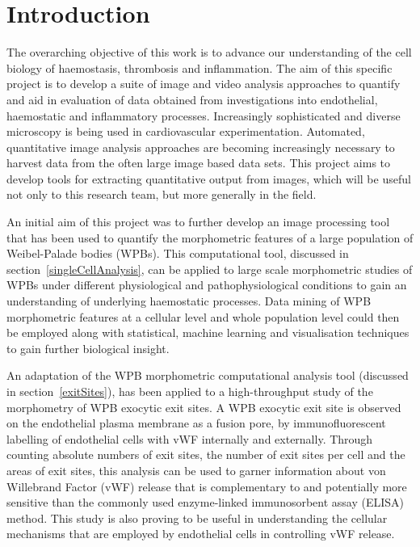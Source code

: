 \chapter{Introduction}
\ifpdf
	\graphicspath{{chapter_1/figs/}}
\fi


The overarching objective of this work is to advance our understanding of the cell biology of haemostasis, thrombosis and inflammation. The aim of this specific project is to develop a suite of image and video analysis approaches to quantify and aid in evaluation of data obtained from investigations into endothelial, haemostatic and inflammatory processes. Increasingly sophisticated and diverse microscopy is being used in cardiovascular experimentation. Automated, quantitative image analysis approaches are becoming increasingly necessary to harvest data from the often large image based data sets. This project aims to develop tools for extracting quantitative output from images, which will be useful not only to this research team, but more generally in the field. 

An initial aim of this project was to further develop an image processing tool that has been used to quantify the morphometric features of a large population of Weibel-Palade bodies (WPBs). This computational tool, discussed in section~\ref{singleCellAnalysis}, can be applied to large scale morphometric studies of WPBs under different physiological and pathophysiological conditions to gain an understanding of underlying haemostatic processes. Data mining of WPB morphometric features at a cellular level and whole population level could then be employed along with statistical, machine learning and visualisation techniques to gain further biological insight.

An adaptation of the WPB morphometric computational analysis tool (discussed in section~\ref{exitSites}), has been applied to a high-throughput study of the morphometry of WPB exocytic exit sites. A WPB exocytic exit site is observed on the endothelial plasma membrane as a fusion pore, by immunofluorescent labelling of endothelial cells with vWF internally and externally. Through counting absolute numbers of exit sites, the number of exit sites per cell and the areas of exit sites, this analysis can be used to garner information about von Willebrand Factor (vWF) release that is complementary to and potentially more sensitive than the commonly used enzyme-linked immunosorbent assay (ELISA) method. This study is also proving to be useful in understanding the cellular mechanisms that are employed by endothelial cells in controlling vWF release.

